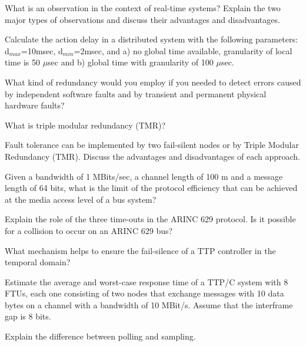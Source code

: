 \pagebreak



 What is an observation in the context of real-time systems? Explain the two major types of
observations and discuss their advantages and disadvantages.


Calculate the action delay in a distributed system with the following parameters:
d$_{max}$=10msec, d$_{min}$=2msec,
and a) no global time available, granularity of local time is 50 $\mu$sec
and b) global time with granularity of 100 $\mu$sec.


\pagebreak


What kind of redundancy would you employ if you needed to detect errors caused by
independent software faults and by transient and permanent physical hardware faults?



What is triple modular redundancy (TMR)?


Fault tolerance can be implemented by two fail-silent nodes or by Triple Modular
Redundancy (TMR). Discuss the advantages and disadvantages of each approach.


Given a bandwidth of 1 MBits/sec, a channel length of 100 m and a message length of 64
bits, what is the limit of the protocol efficiency that can be achieved at the media access
level of a bus system?


Explain the role of the three time-outs in the ARINC 629 protocol. Is it possible for a collision
to occur on an ARINC 629 bus?


What mechanism helps to ensure the fail-silence of a TTP controller in the temporal
domain?


 Estimate the average and worst-case response time of a TTP/C system with 8 FTUs, each
one consisting of two nodes that exchange messages with 10 data bytes on a channel with a
bandwidth of 10 MBit/s. Assume that the interframe gap is 8 bits.


Explain the difference between polling and sampling.
